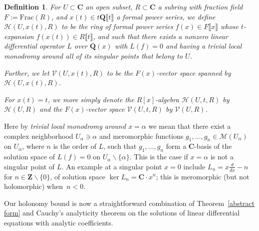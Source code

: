 \documentclass[10pt]{amsart}
\renewcommand\setminus{\smallsetminus}
\def\Z{\mathbf{Z}}
\def\Q{\mathbf{Q}}
\newtheorem{df}[subsubsection]{Definition}
\theoremstyle{remark}
\numberwithin{equation}{subsection}
\def\C{\mathbf{C}}
\begin{document}
\begin{df} \label{holonomy ring}
For $U \subset \C$ an open subset, $R \subset \C$ a subring with fraction field $F := \mathrm{Frac}(R)$, and $x(t) \in t \Q\llbracket t \rrbracket$ a
formal power series,
 we define $\mathcal{H}(U,x(t),R)$ to be the ring  of  formal
power series $f(x) \in F\llbracket x \rrbracket$ whose $t$-expansion $f(x(t)) \in R\llbracket t \rrbracket$, and such that there exists a nonzero 
linear differential operator $L$ over $\overline{\Q}(x)$ with $L(f) = 0$ and having a trivial local monodromy around all of its singular  points that belong to $U$. 

Further, we let $\mathcal{V}(U, x(t), R)$ to be the $F(x)$-vector space spanned by $\mathcal{H}(U,x(t),R)$. 


For $x(t) = t$, we more simply denote the $R[x]$-algebra $\mathcal{H}(U, t, R)$  by $\mathcal{H}(U,R)$ and the $F(x)$-vector space $\mathcal{V}(U,t,R)$ by $\mathcal{V}(U,R)$.
\end{df}

Here by \emph{trivial local monodromy around $x  = \alpha$} we mean that there exist a complex  neighborhood $U_{\alpha} \ni \alpha$ and meromorphic functions $g_1,\dots, g_n \in \mathcal{M}(U_{\alpha})$ on $U_{\alpha}$, where $n$ is the order of $L$,  such that $g_1,\dots, g_n$ form a $\C$-basis of the solution space of $L(f)=0$ on $U_\alpha \setminus \{\alpha\}$. This is the case if $x = \alpha$ is not a singular point of $L$.
An example at a singular point $x = 0$ include $L_n = x \frac{d}{dx} - n$ for $n \in \Z \setminus \{0\}$, of solution space $\ker{L_n} = \C \cdot x^n$; this is meromorphic (but not holomorphic) when~$n < 0$.  

 


Our holonomy bound is now a straightforward combination of Theorem~\ref{abstract form} and Cauchy's analyticity theorem on the solutions of linear differential equations with analytic coefficients. 
\end{document}
